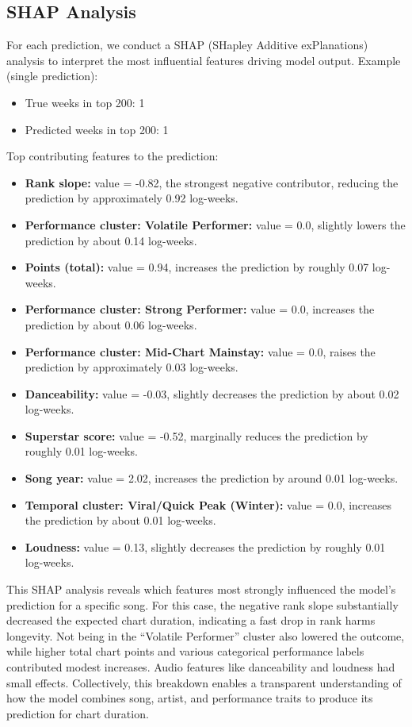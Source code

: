 \documentclass{article}
\begin{document}
\subsection*{SHAP Analysis}
\label{app:SHAP}
For each prediction, we conduct a SHAP (SHapley Additive exPlanations) analysis to interpret the most influential features driving model output.
Example (single prediction):
\begin{itemize}[itemsep=0.5ex, topsep=0pt, parsep=0pt, partopsep=0pt, leftmargin=*]
    \item True weeks in top 200: 1
    \item Predicted weeks in top 200: 1
\end{itemize}
Top contributing features to the prediction:
\begin{itemize}[itemsep=0.5ex, topsep=0pt, parsep=0pt, partopsep=0pt, leftmargin=*]
    \item \textbf{Rank slope:} value = -0.82, the strongest negative contributor, reducing the prediction by approximately 0.92 log-weeks.
    \item \textbf{Performance cluster: Volatile Performer:} value = 0.0, slightly lowers the prediction by about 0.14 log-weeks.
    \item \textbf{Points (total):} value = 0.94, increases the prediction by roughly 0.07 log-weeks.
    \item \textbf{Performance cluster: Strong Performer:} value = 0.0, increases the prediction by about 0.06 log-weeks.
    \item \textbf{Performance cluster: Mid-Chart Mainstay:} value = 0.0, raises the prediction by approximately 0.03 log-weeks.
    \item \textbf{Danceability:} value = -0.03, slightly decreases the prediction by about 0.02 log-weeks.
    \item \textbf{Superstar score:} value = -0.52, marginally reduces the prediction by roughly 0.01 log-weeks.
    \item \textbf{Song year:} value = 2.02, increases the prediction by around 0.01 log-weeks.
    \item \textbf{Temporal cluster: Viral/Quick Peak (Winter):} value = 0.0, increases the prediction by about 0.01 log-weeks.
    \item \textbf{Loudness:} value = 0.13, slightly decreases the prediction by roughly 0.01 log-weeks.
\end{itemize}
This SHAP analysis reveals which features most strongly influenced the model’s prediction for a specific song. For this case, the negative rank slope substantially decreased the expected chart duration, indicating a fast drop in rank harms longevity. Not being in the “Volatile Performer” cluster also lowered the outcome, while higher total chart points and various categorical performance labels contributed modest increases. Audio features like danceability and loudness had small effects. Collectively, this breakdown enables a transparent understanding of how the model combines song, artist, and performance traits to produce its prediction for chart duration.
\end{document}
